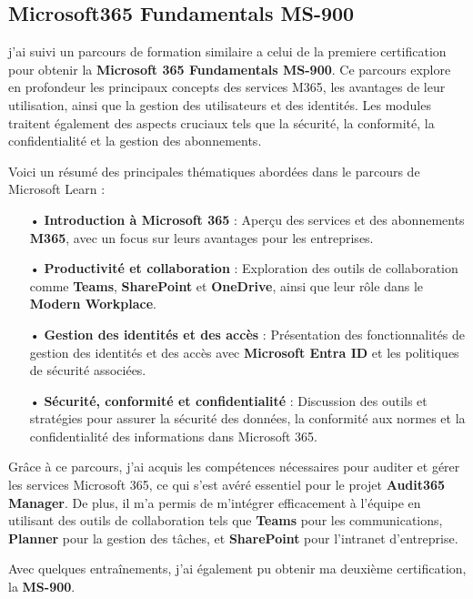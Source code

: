 \subsection{Microsoft365 Fundamentals MS-900}

j'ai suivi un parcours de formation similaire a celui de la premiere certification pour obtenir la \textbf{Microsoft 365 Fundamentals MS-900}. Ce parcours explore en profondeur les principaux concepts des services M365, les avantages de leur utilisation, ainsi que la gestion des utilisateurs et des identités. Les modules traitent également des aspects cruciaux tels que la sécurité, la conformité, la confidentialité et la gestion des abonnements.

Voici un résumé des principales thématiques abordées dans le parcours de Microsoft Learn :

\begin{itemize}
    \item[•] \textbf{Introduction à Microsoft 365} : Aperçu des services et des abonnements \textbf{M365}, avec un focus sur leurs avantages pour les entreprises.
    \item[•] \textbf{Productivité et collaboration} : Exploration des outils de collaboration comme \textbf{Teams}, \textbf{SharePoint} et \textbf{OneDrive}, ainsi que leur rôle dans le \textbf{Modern Workplace}.
    \item[•] \textbf{Gestion des identités et des accès} : Présentation des fonctionnalités de gestion des identités et des accès avec \textbf{Microsoft Entra ID} et les politiques de sécurité associées.
    \item[•] \textbf{Sécurité, conformité et confidentialité} : Discussion des outils et stratégies pour assurer la sécurité des données, la conformité aux normes et la confidentialité des informations dans Microsoft 365.
\end{itemize}

Grâce à ce parcours, j'ai acquis les compétences nécessaires pour auditer et gérer les services Microsoft 365, ce qui s'est avéré essentiel pour le projet \textbf{Audit365 Manager}. De plus, il m'a permis de m'intégrer efficacement à l'équipe en utilisant des outils de collaboration tels que \textbf{Teams} pour les communications, \textbf{Planner} pour la gestion des tâches, et \textbf{SharePoint} pour l'intranet d'entreprise.

Avec quelques entraînements, j'ai également pu obtenir ma deuxième certification, la \textbf{MS-900}.

